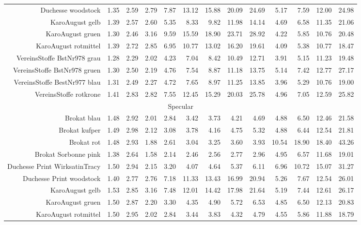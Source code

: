\begin{landscape}
\begin{table}
\begin{tabularx}{\linewidth}{r | rr | rrrrrr | rrrr}
        Duchesse woodstock & 1.35& 2.59& 2.79& 7.87& 13.12& 15.88& 20.09& 24.69& 5.17& 7.59& 12.00& 24.98\\
        KaroAugust gelb & 1.39& 2.57& 2.60& 5.35& 8.33& 9.82& 11.98& 14.14& 4.69& 6.58& 11.35& 21.06\\
        KaroAugust gruen & 1.30& 2.46& 3.16& 9.59& 15.59& 18.90& 23.71& 28.92& 4.22& 5.85& 10.76& 20.48\\
        KaroAugust rotmittel & 1.39& 2.72& 2.85& 6.95& 10.77& 13.02& 16.20& 19.61& 4.09& 5.38& 10.77& 18.47\\
        VereinsStoffe BstNr978 grau & 1.28& 2.29& 2.02& 4.23& 7.04& 8.42& 10.49& 12.71& 3.91& 5.15& 11.23& 19.48\\
        VereinsStoffe BstNr978 gruen & 1.30& 2.50& 2.19& 4.76& 7.54& 8.87& 11.18& 13.75& 5.14& 7.42& 12.77& 27.17\\
        VereinsStoffe BestNr977 blau & 1.31& 2.49& 2.27& 4.72& 7.65& 8.97& 11.25& 13.85& 3.96& 5.29& 10.76& 19.00\\
        VereinsStoffe rotkrone & 1.41& 2.83& 2.82& 7.55& 12.45& 15.29& 20.03& 25.78& 4.96& 7.05& 12.59& 25.82\\
        \midrule
        \multicolumn{13}{c}{Specular}\\
        \midrule
        Brokat blau & 1.48& 2.92& 2.01& 2.84& 3.42& 3.73& 4.21& 4.69& 4.88& 6.50& 12.46& 21.58\\
        Brokat kufper & 1.49& 2.98& 2.12& 3.08& 3.78& 4.16& 4.75& 5.32& 4.88& 6.44& 12.54& 21.81\\
        Brokat rot & 1.48& 2.93& 1.88& 2.61& 3.04& 3.25& 3.60& 3.93& 10.54& 18.90& 18.40& 43.26\\
        Brokat Sorbonne pink & 1.38& 2.64& 1.58& 2.14& 2.46& 2.56& 2.77& 2.96& 4.95& 6.57& 11.68& 19.01\\
        Duchesse Print WirksatinTracy & 1.50& 2.94& 2.15& 3.20& 4.07& 4.64& 5.37& 6.11& 6.96& 10.72& 15.07& 31.27\\
        Duchesse Print woodstock & 1.40& 2.77& 2.76& 7.18& 11.33& 13.43& 16.99& 20.94& 5.26& 7.67& 12.54& 26.01\\
        KaroAugust gelb & 1.53& 2.85& 3.16& 7.48& 12.01& 14.42& 17.98& 21.64& 5.19& 7.44& 12.61& 26.17\\
        KaroAugust gruen & 1.50& 2.87& 2.20& 3.30& 4.35& 4.90& 5.72& 6.53& 4.85& 6.50& 12.13& 20.83\\
        KaroAugust rotmittel & 1.50& 2.95& 2.02& 2.84& 3.44& 3.83& 4.32& 4.79& 4.55& 5.86& 11.88& 18.79\\

\end{tabularx}
\end{table}
\end{landscape}
